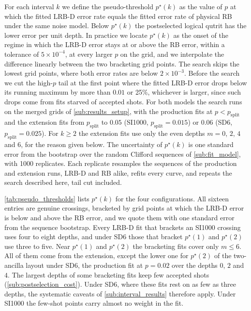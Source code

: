 For each interval $k$ we define the pseudo-threshold $p^\star(k)$ as the value of $p$ at which the fitted LRB-D error rate equals the fitted error rate of physical RB under the same noise model. Below $p^\star(k)$ the postselected logical qutrit has the lower error per unit depth. In practice we locate $p^\star(k)$ as the onset of the regime in which the LRB-D error stays at or above the RB error, within a tolerance of $5\times10^{-4}$, at every larger $p$ on the grid, and we interpolate the difference linearly between the two bracketing grid points. The search skips the lowest grid points, where both error rates are below $2\times10^{-3}$. Before the search we cut the high-$p$ tail at the first point where the fitted LRB-D error drops below its running maximum by more than $0.01$ or 25\%, whichever is larger, since such drops come from fits starved of accepted shots. For both models the search runs on the merged grids of \autoref{sub:results_setup}, with the production fits at $p < p_{\mathrm{split}}$ and the extension fits from $p_{\mathrm{split}}$ to $0.05$ (SI1000, $p_{\mathrm{split}} = 0.015$) or $0.06$ (SD6, $p_{\mathrm{split}} = 0.025$). For $k \ge 2$ the extension fits use only the even depths $m = 0$, $2$, $4$ and $6$, for the reason given below. The uncertainty of $p^\star(k)$ is one standard error from the bootstrap over the random Clifford sequences of \autoref{sub:fit_model}, with 1000 replicates. Each replicate resamples the sequences of the production and extension runs, LRB-D and RB alike, refits every curve, and repeats the search described here, tail cut included.

\autoref{tab:pseudo_thresholds} lists $p^\star(k)$ for the four configurations. All sixteen entries are genuine crossings, bracketed by grid points at which the LRB-D error is below and above the RB error, and we quote them with one standard error from the sequence bootstrap. Every LRB-D fit that brackets an SI1000 crossing uses four to eight depths, and under SD6 those that bracket $p^\star(1)$ and $p^\star(2)$ use three to five. Near $p^\star(1)$ and $p^\star(2)$ the bracketing fits cover only $m \le 6$. All of them come from the extension, except the lower one for $p^\star(2)$ of the two-ancilla layout under SD6, the production fit at $p = 0.02$ over the depths $0$, $2$ and $4$. The largest depths of some bracketing fits keep few accepted shots (\autoref{sub:postselection_cost}). Under SD6, where these fits rest on as few as three depths, the systematic caveats of \autoref{sub:interval_results} therefore apply. Under SI1000 the few-shot points carry almost no weight in the fit.

